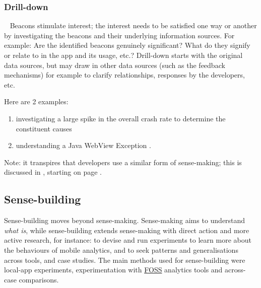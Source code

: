 \subsubsection{Drill-down}~\label{drill-down-research-method}
Beacons stimulate interest; the interest needs to be satisfied one way or another by investigating the beacons and their underlying information sources. 
For example:  Are the identified beacons genuinely significant? What do they signify or relate to in the app and its usage, etc.?  Drill-down starts with the original data sources, but may draw in other data sources (such as the feedback mechanisms) for example to clarify relationships, responses by the developers, etc.

Here are 2 examples:  %
\begin{enumerate}
    \itemsep0em
    \item investigating a large spike in the overall crash rate to determine the constituent causes 
    \item understanding a Java WebView Exception .
\end{enumerate}

Note: it transpires that developers use a similar form of sense-making; this is discussed in , starting on page \pageref{sensemaking-and-decision-taking-by-developers-section}.

%

\subsection{Sense-building}
Sense-building moves beyond sense-making. Sense-making aims to understand \textit{what is}, while sense-building extends sense-making with direct action and more active research, for instance: to devise and run experiments to learn more about the behaviours of mobile analytics, and to seek patterns and generalisations across tools, and case studies. The main methods used for sense-building were local-app experiments, experimentation with \href{glossary-FOSS}{FOSS} analytics tools and across-case comparisons. 

